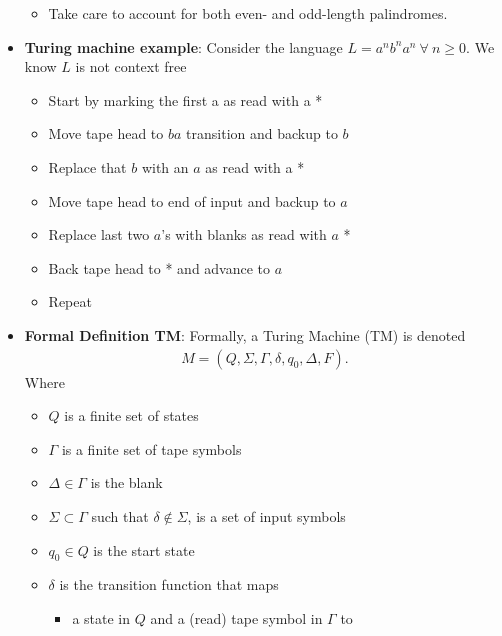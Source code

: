 \documentclass{report}
\begin{document}
\begin{itemize}
\begin{itemize}
                \item Take care to account for both even- and odd-length palindromes.
            \end{itemize}
            \bigbreak \noindent 
        \item \textbf{Turing machine example}: Consider the language $L = a^{n}b^{n}a^{n} \ \forall \ n \geq 0$. We know $L$ is not context free
            \begin{itemize}
                \item Start by marking the first a as read with a *
                \item Move tape head to $ba$ transition and backup to $b$
                \item Replace that $b$ with an $a$ as read with a *
                \item  Move tape head to end of input and backup to $a$
                \item Replace last two $a$'s with blanks as read with $a$ * 
                \item Back tape head to * and advance to $a$
                \item Repeat
            \end{itemize}
            \bigbreak \noindent 
        \item \textbf{Formal Definition TM}: Formally, a Turing Machine (TM) is denoted
            \begin{align*}
                M = (Q, \Sigma, \Gamma, \delta, q_{0}, \Delta, F)
            .\end{align*}
            Where
            \begin{itemize}
                \item $Q$ is a finite set of states
                \item $\Gamma$ is a finite set of tape symbols
                \item $\Delta \in \Gamma$ is the blank
                \item $\Sigma \subset \Gamma$ such that $\delta \not\in \Sigma$, is a set of input symbols
                \item $q_{0} \in Q$ is the start state
                \item $\delta$ is the transition function that maps 
                    \begin{itemize}
                        \item a state in $Q$ and a (read) tape symbol in $\Gamma$ to

\end{itemize}
\end{itemize}
\end{itemize}
\end{document}
